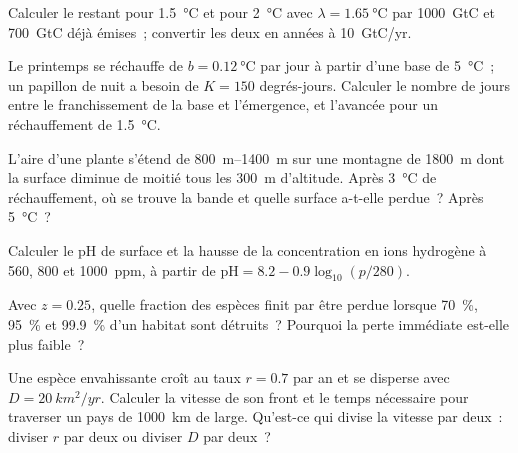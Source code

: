 \begin{exercise}[$\star\star$]\label{exo:b2:global-change:5}
Calculer le  restant pour \qty{1.5}{\celsius} et pour
\qty{2}{\celsius} avec $\lambda = \qty{1.65}{\celsius}$ par
\qty{1000}{GtC} et \qty{700}{GtC} déjà émises~; convertir les deux en
années à \qty{10}{GtC/yr}.
\end{exercise}

\begin{exercise}[$\star\star$]\label{exo:b2:global-change:6}
Le printemps se réchauffe de $b = \qty{0.12}{\celsius}$ par jour à partir
d'une base de
\qty{5}{\celsius}~; un papillon de nuit a besoin de $K = 150$ degrés-jours.
Calculer le nombre de jours entre le franchissement de la base et
l'émergence, et l'avancée pour un réchauffement de \qty{1.5}{\celsius}.
\end{exercise}

\begin{exercise}[$\star\star$]\label{exo:b2:global-change:7}
L'aire d'une plante s'étend de \qtyrange{800}{1400}{m} sur une montagne
de \qty{1800}{m} dont la surface diminue de moitié tous les \qty{300}{m}
d'altitude. Après \qty{3}{\celsius} de réchauffement, où se trouve la
bande et quelle surface a-t-elle perdue~? Après \qty{5}{\celsius}~?
\end{exercise}

\begin{exercise}[$\star\star$]\label{exo:b2:global-change:8}
Calculer le pH de surface et la hausse de la concentration en ions
hydrogène à 560, 800 et \qty{1000}{ppm}, à partir de $\mathrm{pH} = 8.2 -
0.9\log_{10}(p/280)$.
\end{exercise}

\begin{exercise}[$\star\star$]\label{exo:b2:global-change:9}
Avec $z = 0.25$, quelle fraction des espèces finit par être perdue
lorsque \qty{70}{\%}, \qty{95}{\%} et \qty{99.9}{\%} d'un habitat sont
détruits~? Pourquoi la perte immédiate est-elle plus faible~?
\end{exercise}

\begin{exercise}[$\star\star\star$]\label{exo:b2:global-change:10}
Une espèce envahissante croît au taux $r = 0.7$ par an et se disperse
avec $D =
\qty{20}{km^2/yr}$. Calculer la vitesse de son front et le temps
nécessaire pour traverser un pays de \qty{1000}{km} de large. Qu'est-ce
qui divise la vitesse par deux~: diviser $r$ par deux ou diviser $D$ par
deux~?
\end{exercise}

